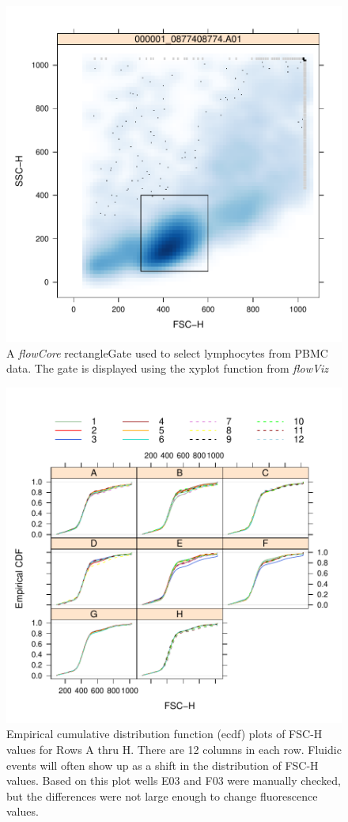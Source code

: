 \documentclass[12pt]{article}
\newcommand{\Rpackage}[1]{{\textit{#1}}}
\begin{document}
\begin{figure}
\centering
\includegraphics{outline-morphGate}
\caption{A \Rpackage{flowCore} rectangleGate used to select lymphocytes from PBMC data. The gate is displayed using the xyplot function from \Rpackage{flowViz}}
\label{fig:morphGate}
\end{figure}

\begin{figure}
\centering
\includegraphics{outline-fluidic}
\caption{Empirical cumulative distribution function (ecdf) plots of FSC-H values for Rows A thru H. There are 12 columns in each row.
Fluidic events will often show up as a shift in the distribution of FSC-H values. 
Based on this plot wells E03 and F03 were manually checked, but the differences were not large enough to change fluorescence values.}
\label{fig:fluidic}
\end{figure}
\end{document}

